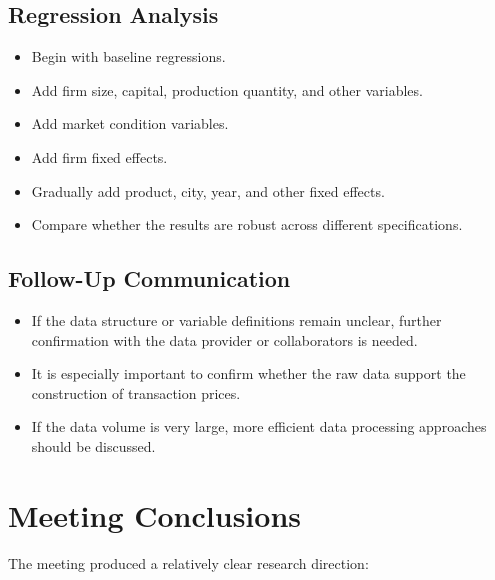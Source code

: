\documentclass[11pt,a4paper]{article}
\begin{document}
\subsection{Regression Analysis}

\begin{itemize}
    \item Begin with baseline regressions.
    \item Add firm size, capital, production quantity, and other variables.
    \item Add market condition variables.
    \item Add firm fixed effects.
    \item Gradually add product, city, year, and other fixed effects.
    \item Compare whether the results are robust across different specifications.
\end{itemize}

\subsection{Follow-Up Communication}

\begin{itemize}
    \item If the data structure or variable definitions remain unclear, further confirmation with the data provider or collaborators is needed.
    \item It is especially important to confirm whether the raw data support the construction of transaction prices.
    \item If the data volume is very large, more efficient data processing approaches should be discussed.
\end{itemize}

\section{Meeting Conclusions}

The meeting produced a relatively clear research direction:
\end{document}
